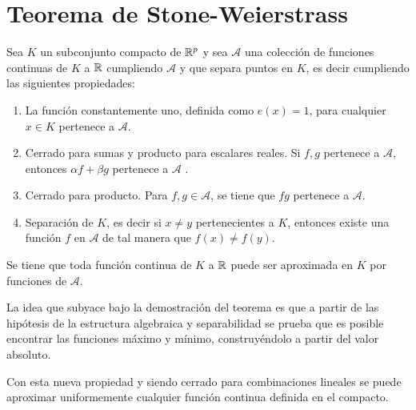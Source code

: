 %

\section{Teorema de Stone-Weierstrass }\label{ch:TeoremaStoneWeiertrass}

\begin{teorema}

    Sea $K$ un subconjunto compacto de $\mathbb{R}^p$ y sea $\mathcal{A}$ una colección de 
    funciones continuas de $K$ a $\mathbb{R}$ cumpliendo $\mathcal{A}$ y 
    que separa puntos en $K$, es decir cumpliendo las siguientes propiedades: 

    \begin{enumerate}
        \item La función constantemente uno, definida como $e(x)=1$, para cualquier $x\in K$ pertenece a $\mathcal{A}$.
        \item Cerrado para sumas y producto para escalares reales. Si $f,g$ pertenece a  $\mathcal{A}$, entonces $\alpha f + \beta g$ pertenece a $\mathcal{A}$ . 
        \item Cerrado para producto. Para $f,g \in \mathcal A$, se tiene que $fg$ pertenece a $\mathcal{A}$. 
        \item Separación de $K$, es decir si $x \neq y$ pertenecientes a $K$, entonces existe una función $f$ en $\mathcal{A}$  de tal manera que $f(x) \neq f(y)$. 
    \end{enumerate}
    
    Se tiene que toda función continua de $K$ a $\mathbb{R}$ puede ser aproximada en $K$ por funciones de $\mathcal A$. 

\end{teorema}  

La idea que subyace bajo la demostración del teorema es que a partir de las hipótesis de la estructura algebraica y 
separabilidad 
se prueba que es posible encontrar las funciones máximo y mínimo, 
construyéndolo a partir del valor absoluto.   

Con esta nueva propiedad y siendo cerrado para combinaciones lineales 
se puede aproximar uniformemente cualquier función continua definida en el compacto. 

